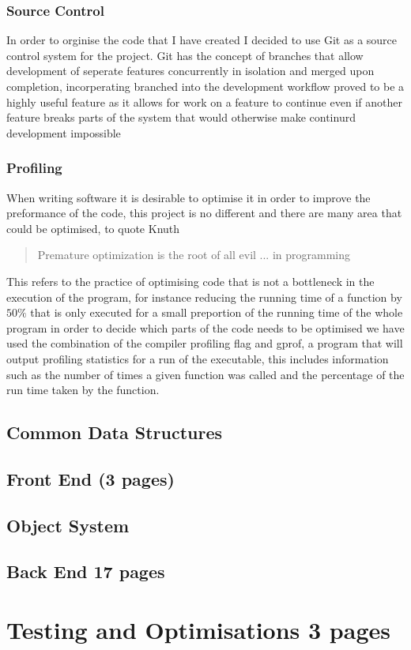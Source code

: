 \subsection{Source Control}
In order to orginise the code that I have created I decided to use Git as a source control system for the project.
Git has the concept of branches that allow development of seperate features concurrently in isolation and
merged upon completion, incorperating branched into the development workflow proved to be a highly useful feature
as it allows for work on a feature to continue even if another feature breaks parts of the system that would
otherwise make continurd development impossible

\subsection{Profiling}
When writing software it is desirable to optimise it in order to improve the preformance of the code, this project
is no different and there are many area that could be optimised, to quote Knuth

\begin{quotation}
{Premature optimization is the root of all evil ... in programming \cite{Knuth74a}}
\end{quotation}

This refers to the practice of optimising code that is not a bottleneck in the execution of the program, for instance
reducing the running time of a function by $50\%$ that is only executed for a small preportion of the running time of
the whole program in order to decide which parts of the code needs to be optimised we have used the combination of
the compiler profiling flag and gprof, a program that will output profiling statistics for a run of the executable,
this includes information such as the number of times a given function was called and the percentage of the run time
taken by the function.

\newpage
\section{Common Data Structures}

\newpage
\section{Front End (3 pages)}

\newpage
\section{Object System}

\newpage
\section{Back End 17 pages}

\newpage
\chapter{Testing and Optimisations 3 pages}

